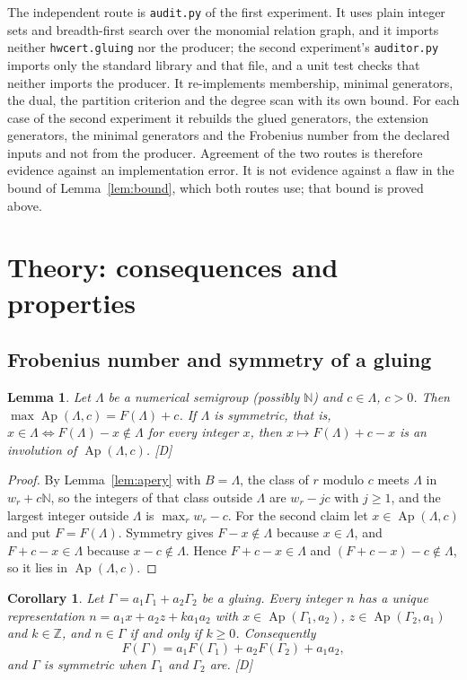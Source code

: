 \documentclass[11pt]{article}
\newtheorem{corollary}[theorem]{Corollary}
\newtheorem{lemma}[theorem]{Lemma}
\theoremstyle{definition}
\theoremstyle{remark}
\newcommand{\N}{\mathbb{N}}
\newcommand{\Z}{\mathbb{Z}}
\newcommand{\Ap}{\operatorname{Ap}}
\newcommand{\mD}{\emph{[D]}}
\begin{document}
The independent route is \texttt{audit.py} of the first experiment. It uses plain integer sets and breadth-first search over the
monomial relation graph, and it imports neither \texttt{hwcert.gluing} nor the producer; the second experiment's
\texttt{auditor.py} imports only the standard library and that file, and a unit test checks that neither imports the producer.
It re-implements membership, minimal generators, the dual, the partition criterion and the degree scan with its own bound. For each
case of the second experiment it rebuilds the glued generators, the extension generators, the minimal generators and the
Frobenius number from the declared inputs and not from the producer. Agreement of the two routes is therefore evidence
against an implementation error. It is not evidence against a flaw in the bound of Lemma~\ref{lem:bound}, which both
routes use; that bound is proved above.

\section{Theory: consequences and properties}\label{sec:theory}

\subsection{Frobenius number and symmetry of a gluing}

\begin{lemma}\label{lem:frob}
Let $\Lambda$ be a numerical semigroup (possibly $\N$) and $c\in\Lambda$, $c>0$. Then $\max\Ap(\Lambda,c)=F(\Lambda)+c$. If
$\Lambda$ is symmetric, that is, $x\in\Lambda\iff F(\Lambda)-x\notin\Lambda$ for every integer $x$, then
$x\mapsto F(\Lambda)+c-x$ is an involution of $\Ap(\Lambda,c)$. \mD{}
\end{lemma}

\begin{proof}
By Lemma~\ref{lem:apery} with $B=\Lambda$, the class of $r$ modulo $c$ meets $\Lambda$ in $w_r+c\N$, so the integers of that class
outside $\Lambda$ are $w_r-jc$ with $j\ge1$, and the largest integer outside $\Lambda$ is $\max_rw_r-c$. For the second
claim let $x\in\Ap(\Lambda,c)$ and put $F=F(\Lambda)$. Symmetry gives $F-x\notin\Lambda$ because $x\in\Lambda$, and
$F+c-x\in\Lambda$ because $x-c\notin\Lambda$. Hence $F+c-x\in\Lambda$ and $(F+c-x)-c\notin\Lambda$, so it lies in $\Ap(\Lambda,c)$.
\end{proof}

\begin{corollary}\label{cor:frobsym}
Let $\Gamma=a_1\Gamma_1+a_2\Gamma_2$ be a gluing. Every integer $n$ has a unique representation
$n=a_1x+a_2z+ka_1a_2$ with $x\in\Ap(\Gamma_1,a_2)$, $z\in\Ap(\Gamma_2,a_1)$ and $k\in\Z$, and $n\in\Gamma$ if and only if $k\ge0$.
Consequently
\begin{equation}\label{eq:frob}
F(\Gamma)=a_1F(\Gamma_1)+a_2F(\Gamma_2)+a_1a_2,
\end{equation}
and $\Gamma$ is symmetric when $\Gamma_1$ and $\Gamma_2$ are. \mD{}
\end{corollary}
\end{document}
